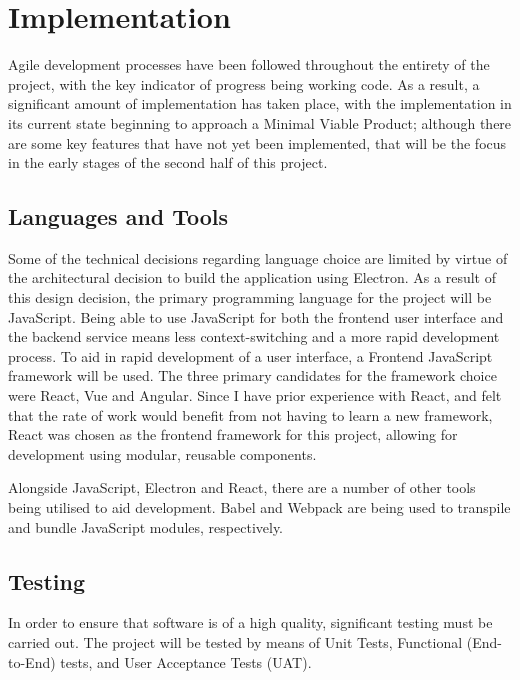 \chapter{Implementation}


Agile development processes have been followed throughout the entirety of the project, with the key indicator of progress being working code. As a result, a significant amount of implementation has taken place, with the implementation in its current state beginning to approach a Minimal Viable Product; although there are some key features that have not yet been implemented, that will be the focus in the early stages of the second half of this project. 

\section{Languages and Tools}

Some of the technical decisions regarding language choice are limited by virtue of the architectural decision to build the application using Electron. As a result of this design decision, the primary programming language for the project will be JavaScript. Being able to use JavaScript for both the frontend user interface and the backend service means less context-switching and a more rapid development process. To aid in rapid development of a user interface, a Frontend JavaScript framework will be used. The three primary candidates for the framework choice were React, Vue and Angular. Since I have prior experience with React, and felt that the rate of work would benefit from not having to learn a new framework, React was chosen as the frontend framework for this project, allowing for development using modular, reusable components.

Alongside JavaScript, Electron and React, there are a number of other tools being utilised to aid development. Babel and Webpack are being used to transpile and bundle JavaScript modules, respectively. 

\section{Testing}

In order to ensure that software is of a high quality, significant testing must be carried out. The project will be tested by means of Unit Tests, Functional (End-to-End) tests, and User Acceptance Tests (UAT).

